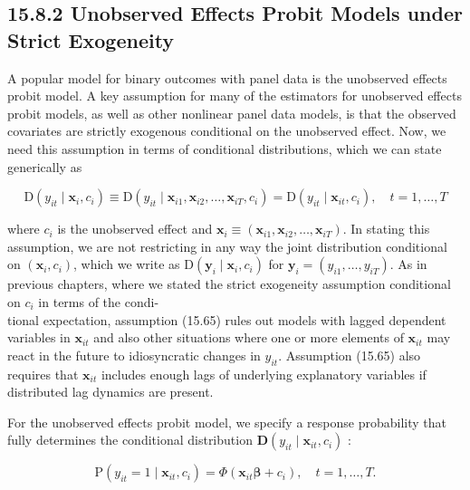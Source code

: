 \documentclass[10pt]{article}
\begin{document}
\subsection*{15.8.2 Unobserved Effects Probit Models under Strict Exogeneity}
A popular model for binary outcomes with panel data is the unobserved effects probit model. A key assumption for many of the estimators for unobserved effects probit models, as well as other nonlinear panel data models, is that the observed covariates are strictly exogenous conditional on the unobserved effect. Now, we need this assumption in terms of conditional distributions, which we can state generically as


\begin{equation*}
\mathrm{D}\left(y_{i t} \mid \mathbf{x}_{i}, c_{i}\right) \equiv \mathrm{D}\left(y_{i t} \mid \mathbf{x}_{i 1}, \mathbf{x}_{i 2}, \ldots, \mathbf{x}_{i T}, c_{i}\right)=\mathrm{D}\left(y_{i t} \mid \mathbf{x}_{i t}, c_{i}\right), \quad t=1, \ldots, T \tag{15.65}
\end{equation*}


where $c_{i}$ is the unobserved effect and $\mathbf{x}_{i} \equiv\left(\mathbf{x}_{i 1}, \mathbf{x}_{i 2}, \ldots, \mathbf{x}_{i T}\right)$. In stating this assumption, we are not restricting in any way the joint distribution conditional on $\left(\mathbf{x}_{i}, c_{i}\right)$, which we write as $\mathrm{D}\left(\mathbf{y}_{i} \mid \mathbf{x}_{i}, c_{i}\right)$ for $\mathbf{y}_{i}=\left(y_{i 1}, \ldots, y_{i T}\right)$. As in previous chapters, where we stated the strict exogeneity assumption conditional on $c_{i}$ in terms of the condi-\\
tional expectation, assumption (15.65) rules out models with lagged dependent variables in $\mathbf{x}_{i t}$ and also other situations where one or more elements of $\mathbf{x}_{i t}$ may react in the future to idiosyncratic changes in $y_{i t}$. Assumption (15.65) also requires that $\mathbf{x}_{i t}$ includes enough lags of underlying explanatory variables if distributed lag dynamics are present.

For the unobserved effects probit model, we specify a response probability that fully determines the conditional distribution $\mathbf{D}\left(y_{i t} \mid \mathbf{x}_{i t}, c_{i}\right)$ :


\begin{equation*}
\mathrm{P}\left(y_{i t}=1 \mid \mathbf{x}_{i t}, c_{i}\right)=\Phi\left(\mathbf{x}_{i t} \boldsymbol{\beta}+c_{i}\right), \quad t=1, \ldots, T . \tag{15.66}
\end{equation*}
\end{document}
